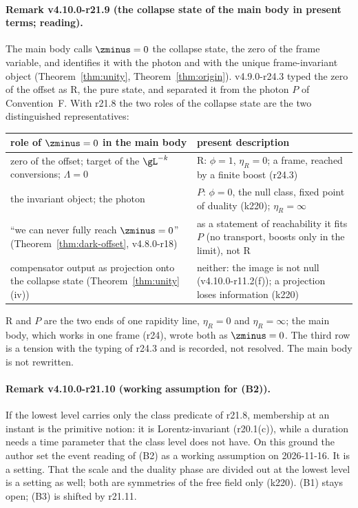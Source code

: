 \paragraph{Remark v4.10.0-r21.9 (the collapse state of the main body in present terms; reading).}
The main body calls \(\zminus=0\) the collapse state, the zero of the frame variable, and identifies it with the photon and with the
unique frame-invariant object (Theorem~\ref{thm:unity}, Theorem~\ref{thm:origin}).  v4.9.0-r24.3 typed the zero of the offset as R, the
pure state, and separated it from the photon \(P\) of Convention~F.  With r21.8 the two roles of the collapse state are the two
distinguished representatives:
\begin{center}
\small
\begin{tabular}{@{}>{\raggedright\arraybackslash}p{}>{\raggedright\arraybackslash}p{}@{}}
\toprule
role of \(\zminus=0\) in the main body & present description\\
\midrule
zero of the offset; target of the \(\gL^{-k}\) conversions; \(\Lambda=0\) & R: \(\phi=1\), \(\eta_R=0\); a frame, reached by a finite boost (r24.3)\\
the invariant object; the photon & \(P\): \(\phi=0\), the null class, fixed point of duality (k220); \(\eta_R=\infty\)\\
``we can never fully reach \(\zminus=0\)'' (Theorem~\ref{thm:dark-offset}, v4.8.0-r18) & as a statement of reachability it fits \(P\) (no transport, boosts only in the limit), not R\\
compensator output as projection onto the collapse state (Theorem~\ref{thm:unity}(iv)) & neither: the image is not null (v4.10.0-r11.2(f)); a projection loses information (k220)\\
\bottomrule
\end{tabular}
\end{center}
R and \(P\) are the two ends of one rapidity line, \(\eta_R=0\) and \(\eta_R=\infty\); the main body, which works in one frame (r24), wrote both
as \(\zminus=0\).  The third row is a tension with the typing of r24.3 and is recorded, not resolved.  The main body is not rewritten.

\paragraph{Remark v4.10.0-r21.10 (working assumption for (B2)).}
If the lowest level carries only the class predicate of r21.8, membership at an instant is the primitive notion: it is
Lorentz-invariant (r20.1(c)), while a duration needs a time parameter that the class level does not have.  On this ground the author
set the event reading of (B2) as a working assumption on 2026-11-16.  It is a setting.  That the scale and the duality phase are
divided out at the lowest level is a setting as well; both are symmetries of the free field only (k220).  (B1) stays open; (B3) is
shifted by r21.11.

